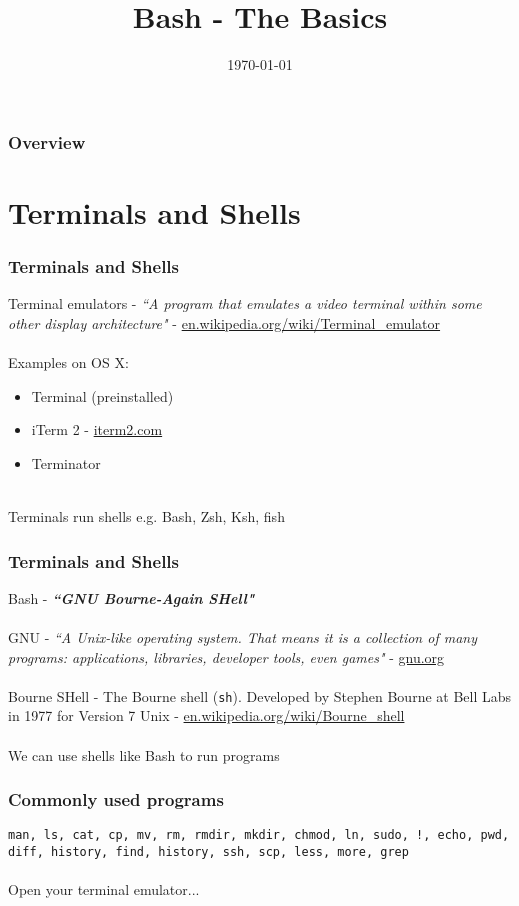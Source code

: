 \documentclass{beamer}
\title[Bash]{Bash - The Basics} %
\author{} %
\institute[] %
{
 \\ %
\medskip
\textit{chris@cjwfuller.com}
}
\date{\today}
\begin{document}
\begin{frame}
\titlepage
\end{frame}

\begin{frame}
\frametitle{Overview}
\tableofcontents
\end{frame}

\section{Terminals and Shells}

\begin{frame}
\frametitle{Terminals and Shells}
Terminal emulators  - \textit{``A program that emulates a video terminal within some other display architecture"} - \url{en.wikipedia.org/wiki/Terminal_emulator}
\\~\\
Examples on OS X:
\begin{itemize}
	\item Terminal (preinstalled)
	\item iTerm 2 - \url{iterm2.com}
	\item Terminator
\end{itemize}
~\\
Terminals run shells e.g. Bash, Zsh, Ksh, fish
\end{frame}


\begin{frame}
\frametitle{Terminals and Shells}
Bash - \textbf{\textit{``GNU Bourne-Again SHell"}}
\\~\\
GNU - \textit{``A Unix-like operating system. That means it is a collection of many programs: applications, libraries, developer tools, even games"} - \url{gnu.org}
\\~\\
Bourne SHell - The Bourne shell (\texttt{sh}).  Developed by Stephen Bourne at Bell Labs in 1977 for Version 7 Unix - \url{en.wikipedia.org/wiki/Bourne_shell}
\\~\\
We can use shells like Bash to run programs
\end{frame}


\begin{frame}
\frametitle{Commonly used programs}
\texttt{man, ls, cat, cp, mv, rm, rmdir, mkdir, chmod, ln, sudo, !, echo, pwd, diff, history, find, history, ssh, scp, less, more, grep}
\\~\\
Open your terminal emulator...
\end{frame}
\end{document}
